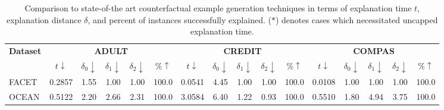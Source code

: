 \begin{table*}[t]
\small
\centering
\begin{tabularx}{0.95\textwidth}{|X|ccccc|ccccc|ccccc|}
\hline\textbf{Dataset} & \multicolumn{5}{c|}{\textbf{ADULT}} & \multicolumn{5}{c|}{\textbf{CREDIT}} & \multicolumn{5}{c|}{\textbf{COMPAS}} \\
& $t\downarrow$ & $\delta_0\downarrow$ & $\delta_1\downarrow$ & $\delta_2\downarrow$ & $\%\uparrow$ & $t\downarrow$ & $\delta_0\downarrow$ & $\delta_1\downarrow$ & $\delta_2\downarrow$ & $\%\uparrow$ & $t\downarrow$ & $\delta_0\downarrow$ & $\delta_1\downarrow$ & $\delta_2\downarrow$ & $\%\uparrow$ \\
\hline
FACET & 0.2857 & 1.55 & 1.00 & 1.00 & 100.0 & 0.0541 & 4.45 & 1.00 & 1.00 & 100.0 & 0.0108 & 1.00 & 1.00 & 1.00 & 100.0 \\
OCEAN & 0.5122 & 2.20 & 2.66 & 2.31 & 100.0 & 3.0584 & 6.40 & 1.22 & 0.93 & 100.0 & 0.5510 & 1.80 & 4.94 & 3.75 & 100.0 \\
\hline
\end{tabularx}
\caption{Comparison to state-of-the art counterfactual example generation techniques in terms of explanation time $t$, explanation distance $\delta$, and percent of instances successfully explained. ($\ast$) denotes cases which necessitated uncapped explanation time.}
\label{tab.compare_methods}
\vspace{-7mm}
\end{table*}
